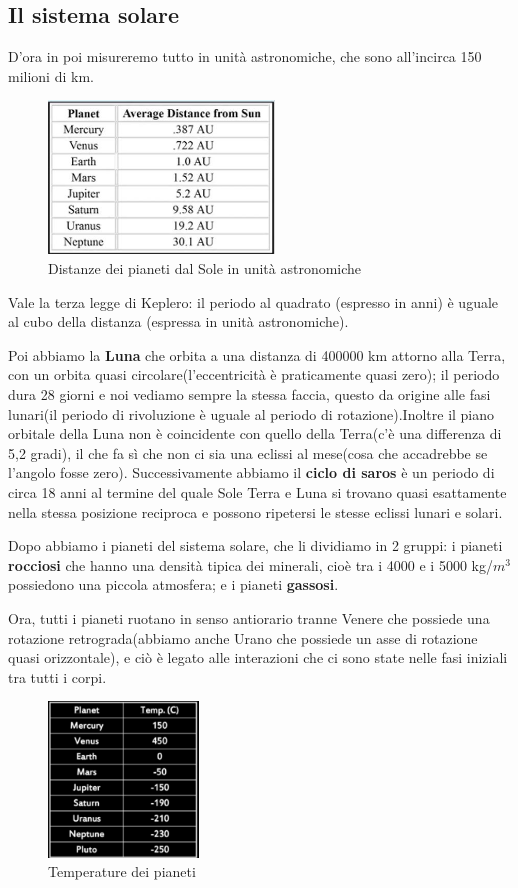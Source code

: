 \documentclass[a4paper,11pt]{article}
\begin{document}
\subsection{Il sistema solare}
D'ora in poi misureremo tutto in unità astronomiche, che sono all'incirca 150 milioni di km. 
\begin{figure}[h!!]
        \centering
        \includegraphics[width=6cm]{Distanze.JPG}
        \caption{Distanze dei pianeti dal Sole in unità astronomiche}
        \label{fig:Correnti parassite}
    \end{figure}
Vale la terza legge di Keplero: il periodo al quadrato (espresso in anni) è uguale al cubo della distanza (espressa in unità astronomiche).

Poi abbiamo la \textbf{Luna} che orbita a una distanza di 400000 km attorno alla Terra, con un orbita quasi circolare(l'eccentricità è praticamente quasi zero); il periodo dura 28 giorni e noi vediamo sempre la stessa faccia, questo da origine alle fasi lunari(il periodo di rivoluzione è uguale al periodo di rotazione).Inoltre il piano orbitale della Luna non è coincidente con quello della Terra(c'è una differenza di 5,2 gradi), il che fa sì che non ci sia una eclissi al mese(cosa che accadrebbe se l'angolo fosse zero). Successivamente abbiamo il \textbf{ciclo di saros} è un periodo di circa 18 anni al termine del quale Sole Terra e Luna si trovano quasi esattamente nella stessa posizione reciproca e possono ripetersi le stesse eclissi lunari e solari. 

Dopo abbiamo i pianeti del sistema solare, che li dividiamo in 2 gruppi: i pianeti \textbf{rocciosi} che hanno una densità tipica dei minerali, cioè tra i 4000 e i 5000 kg/$m^{3}$  possiedono una piccola atmosfera; e i pianeti \textbf{gassosi}.

Ora, tutti i pianeti ruotano in senso antiorario tranne Venere che possiede una rotazione retrograda(abbiamo anche Urano che possiede un asse di rotazione quasi orizzontale), e ciò è legato alle interazioni che ci sono state nelle fasi iniziali tra tutti i corpi.
\begin{figure}[h!!]
        \centering
        \includegraphics[width=4cm]{Temperature.JPG}
        \caption{Temperature dei pianeti}
        \label{fig:Correnti parassite}
    \end{figure}
    
\end{document}
